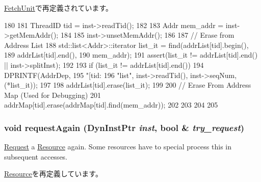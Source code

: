\hyperlink{classFetchUnit_a8a894d91761439227fd27d91a318c31f}{FetchUnit}で再定義されています。


\begin{DoxyCode}
180 {
181     ThreadID tid = inst->readTid();
182 
183     Addr mem_addr = inst->getMemAddr();
184     
185     inst->unsetMemAddr();
186 
187     // Erase from Address List
188     std::list<Addr>::iterator list_it = find(addrList[tid].begin(),
189                                           addrList[tid].end(),
190                                           mem_addr);
191     assert(list_it != addrList[tid].end() || inst->splitInst);
192 
193     if (list_it != addrList[tid].end()) {
194         DPRINTF(AddrDep,
195                 "[tid:%
196                 "list\n", inst->readTid(), inst->seqNum, (*list_it));
197 
198         addrList[tid].erase(list_it);
199 
200         // Erase From Address Map (Used for Debugging)
201         addrMap[tid].erase(addrMap[tid].find(mem_addr));
202     }
203     
204 
205 }
\end{DoxyCode}
\hypertarget{classCacheUnit_a9063fd6f97e36e3565247339ffa3882c}{
\subsubsection[{requestAgain}]{\setlength{\rightskip}{0pt plus 5cm}void requestAgain ({\bf DynInstPtr} {\em inst}, \/  bool \& {\em try\_\-request})}}
\label{classCacheUnit_a9063fd6f97e36e3565247339ffa3882c}
\hyperlink{classRequest}{Request} a \hyperlink{classResource}{Resource} again. Some resources have to special process this in subsequent accesses. 

\hyperlink{classResource_a9063fd6f97e36e3565247339ffa3882c}{Resource}を再定義しています。


